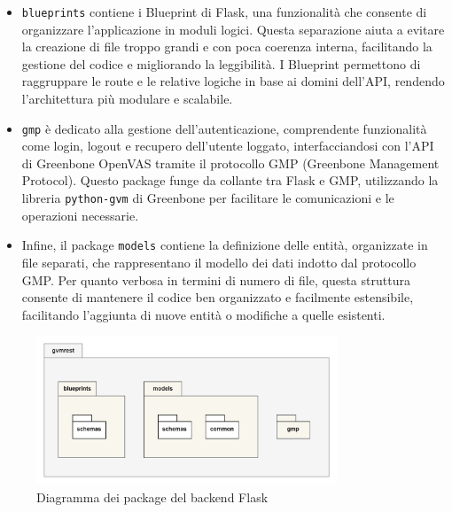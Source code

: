 \begin{itemize}
    \item \texttt{blueprints} contiene i Blueprint di Flask, una funzionalità che consente di organizzare l'applicazione in moduli logici. Questa separazione aiuta a evitare la creazione di file troppo grandi e con poca coerenza interna, facilitando la gestione del codice e migliorando la leggibilità. I Blueprint permettono di raggruppare le route e le relative logiche in base ai domini dell'API, rendendo l'architettura più modulare e scalabile.
    \item \texttt{gmp} è dedicato alla gestione dell'autenticazione, comprendente funzionalità come login, logout e recupero dell'utente loggato, interfacciandosi con l'API di Greenbone OpenVAS tramite il protocollo GMP (Greenbone Management Protocol). Questo package funge da collante tra Flask e GMP, utilizzando la libreria \texttt{python-gvm} di Greenbone per facilitare le comunicazioni e le operazioni necessarie.
    \item Infine, il package \texttt{models} contiene la definizione delle entità, organizzate in file separati, che rappresentano il modello dei dati indotto dal protocollo GMP. Per quanto verbosa in termini di numero di file, questa struttura consente di mantenere il codice ben organizzato e facilmente estensibile, facilitando l'aggiunta di nuove entità o modifiche a quelle esistenti.
\end{itemize}

\begin{figure}
    \centering
    \includegraphics[width=0.8\textwidth]{img/packages.png}
    \caption{Diagramma dei package del backend Flask}
\end{figure}


